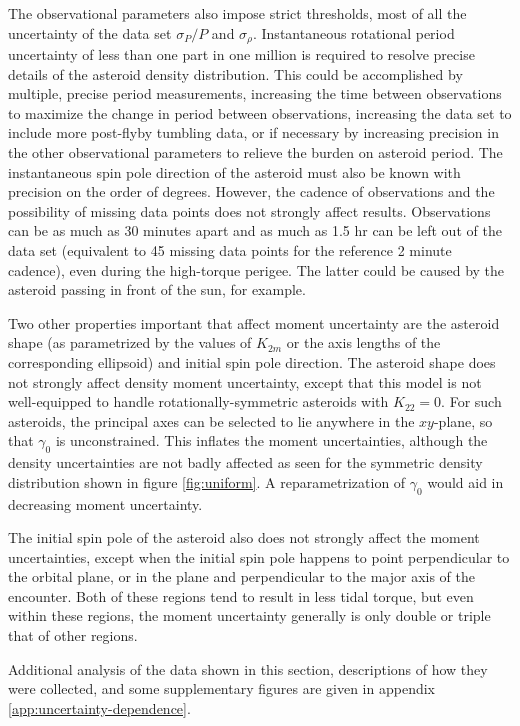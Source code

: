 \documentclass[fleqn,usenatbib]{mnras}
\begin{document}
The observational parameters also impose strict thresholds, most of all the uncertainty of the data set $\sigma_P / P$ and $\sigma_\rho$. Instantaneous rotational period uncertainty of less than one part in one million is required to resolve precise details of the asteroid density distribution. This could be accomplished by multiple, precise period measurements, increasing the time between observations to maximize the change in period between observations, increasing the data set to include more post-flyby tumbling data, or if necessary by increasing precision in the other observational parameters to relieve the burden on asteroid period. The instantaneous spin pole direction of the asteroid must also be known with precision on the order of degrees. However, the cadence of observations and the possibility of missing data points does not strongly affect results. Observations can be as much as 30 minutes apart and as much as 1.5 hr can be left out of the data set (equivalent to 45 missing data points for the reference 2 minute cadence), even during the high-torque perigee. The latter could be caused by the asteroid passing in front of the sun, for example. 

Two other properties important that affect moment uncertainty are the asteroid shape (as parametrized by the values of $K_{2m}$ or the axis lengths of the corresponding ellipsoid) and initial spin pole direction. The asteroid shape does not strongly affect density moment uncertainty, except that this model is not well-equipped to handle rotationally-symmetric asteroids with $K_{22} = 0$. For such asteroids, the principal axes can be selected to lie anywhere in the $xy$-plane, so that $\gamma_0$ is unconstrained. This inflates the moment uncertainties, although the density uncertainties are not badly affected as seen for the symmetric density distribution shown in figure \ref{fig:uniform}. A reparametrization of $\gamma_0$ would aid in decreasing moment uncertainty.


The initial spin pole of the asteroid also does not strongly affect the moment uncertainties, except when the initial spin pole happens to point perpendicular to the orbital plane, or in the plane and perpendicular to the major axis of the encounter. Both of these regions tend to result in less tidal torque, but even within these regions, the moment uncertainty generally is only double or triple that of other regions. 

Additional analysis of the data shown in this section, descriptions of how they were collected, and some supplementary figures are given in appendix \ref{app:uncertainty-dependence}.
                 
\end{document}
